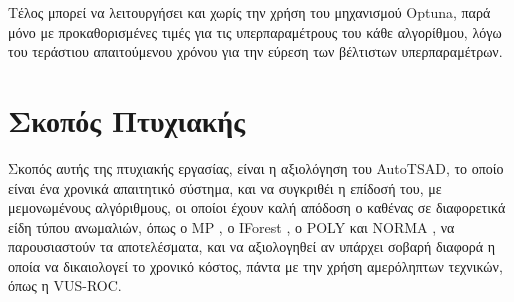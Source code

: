 Τέλος μπορεί να λειτουργήσει και χωρίς την χρήση του μηχανισμού Optuna, παρά μόνο με προκαθορισμένες τιμές για τις υπερπαραμέτρους του κάθε αλγορίθμου, λόγω του τεράστιου απαιτούμενου χρόνου για την εύρεση των βέλτιστων υπερπαραμέτρων.


\section{Σκοπός Πτυχιακής}
\label{purpose}

Σκοπός αυτής της πτυχιακής εργασίας, είναι η αξιολόγηση του AutoTSAD, το οποίο είναι ένα χρονικά απαιτητικό σύστημα, και να συγκριθέι η επίδοσή του, με μεμονωμένους αλγόριθμους, οι οποίοι έχουν καλή απόδοση ο καθένας σε διαφορετικά είδη τύπου ανωμαλιών, όπως ο MP \cite{linardi2020matrix}, ο IForest \cite{liu2008isolation}, ο POLY \cite{li1997poly} και NORMA \cite{mahin2024norma}, να παρουσιαστούν τα αποτελέσματα, και να αξιολογηθεί αν υπάρχει σοβαρή διαφορά η οποία να δικαιολογεί το χρονικό κόστος, πάντα με την χρήση αμερόληπτων τεχνικών, όπως η VUS-ROC\cite{paparrizos2022volume}.



